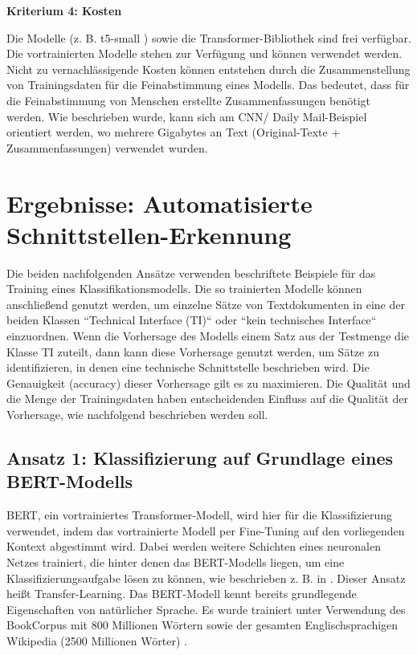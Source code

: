 {\bf Kriterium 4: Kosten}

Die Modelle (z. B. t5-small \cite{t5}) sowie die Transformer-Bibliothek \cite{Transformers} sind frei verfügbar. Die vortrainierten Modelle stehen zur Verfügung und können verwendet werden. Nicht zu vernachlässigende Kosten können entstehen durch die Zusammenstellung von Trainingsdaten für die Feinabstimmung eines Modells. Das bedeutet, dass für die Feinabstimmung von Menschen erstellte Zusammenfassungen benötigt werden. Wie beschrieben wurde, kann sich am CNN/ Daily Mail-Beispiel orientiert werden, wo mehrere Gigabytes an Text (Original-Texte + Zusammenfassungen) verwendet wurden. 

\section{Ergebnisse: Automatisierte Schnittstellen-Erkennung}

Die beiden nachfolgenden Ansätze verwenden beschriftete Beispiele für das Training eines Klassifikationsmodells. Die so trainierten Modelle können anschließend genutzt werden, um einzelne Sätze von Textdokumenten in eine der beiden Klassen ``Technical Interface (TI)`` oder ``kein technisches Interface`` einzuordnen. Wenn die Vorhersage des Modells einem Satz aus der Testmenge die Klasse TI zuteilt, dann kann diese Vorhersage genutzt werden, um Sätze zu identifizieren, in denen eine technische Schnittstelle beschrieben wird. Die Genauigkeit (accuracy) dieser Vorhersage gilt es zu maximieren. Die Qualität und die Menge der Trainingsdaten haben entscheidenden Einfluss auf die Qualität der Vorhersage, wie nachfolgend beschrieben werden soll.

\subsection{Ansatz 1: Klassifizierung auf Grundlage eines BERT-Modells}

BERT, ein vortrainiertes Transformer-Modell, wird hier für die Klassifizierung verwendet, indem das vortrainierte Modell per Fine-Tuning auf den vorliegenden Kontext abgestimmt wird. Dabei werden weitere Schichten eines neuronalen Netzes trainiert, die hinter denen das BERT-Modells liegen, um eine Klassifizierungsaufgabe lösen zu können, wie beschrieben z. B. in \cite[S. 2]{Tang}. Dieser Ansatz heißt Transfer-Learning. Das BERT-Modell kennt bereits grundlegende Eigenschaften von natürlicher Sprache. Es wurde trainiert unter Verwendung des BookCorpus mit 800 Millionen Wörtern sowie der gesamten Englischsprachigen Wikipedia (2500 Millionen Wörter) \cite{devlin}.

